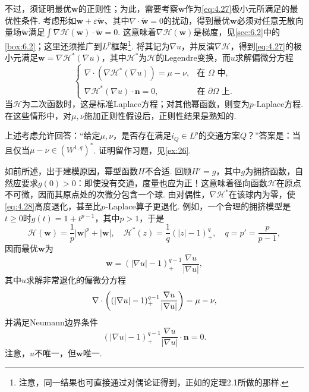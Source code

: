 \label{idx:root4-p160-helmholtz}不过，须证明最优$\mathbf w$的正则性；为此，需要考察$\mathbf w$作为\eqref{eq:4.27}极小元所满足的最优性条件. 考虑形如$\mathbf w+\varepsilon\widetilde{\mathbf w}$、其中$\nabla\cdot\widetilde{\mathbf w}=0$的扰动，得到最优$\mathbf w$必须对任意无散向量场$\widetilde{\mathbf w}$满足$\int\nabla\mathscr H(\mathbf w)\cdot\widetilde{\mathbf w}=0$. 这意味着$\nabla\mathscr H(\mathbf w)$是梯度，见\autoref{sec:6.2}中的\autoref{box:6.2}；这里还须推广到$L^p$框架\footnote{注意，同一结果也可直接通过对偶论证得到，正如\cite{b80}的定理2.1所做的那样.}. 将其记为$\nabla u$，并反演$\nabla\mathscr H$，得到\eqref{eq:4.27}的极小元满足$\mathbf w=\nabla\mathscr H^*(\nabla u)$，其中$\mathscr H^*$为$\mathscr H$的Legendre变换，而$u$求解偏微分方程
\begin{equation}\label{eq:4.28}
\begin{cases}
\nabla\cdot(\nabla\mathscr H^*(\nabla u))=\mu-\nu,&\text{在 }\Omega\text{ 中},\\
\nabla\mathscr H^*(\nabla u)\cdot\mathbf n=0,&\text{在 }\partial\Omega\text{ 上}.
\end{cases}
\end{equation}
当$\mathscr H$为二次函数时，这是标准Laplace方程；对其他幂函数，则变为$p$-Laplace方程. 在这些情形中，对$\mu,\nu$施加正则性假设后，正则性结果是熟知的.

\begin{remark}\label{obj:4.36}
上述考虑允许回答：“给定$\mu,\nu$，是否存在满足$i_Q\in L^p$的交通方案$Q$？”答案是：当且仅当$\mu-\nu\in(W^{1,q})^*$. 证明留作习题，见\autoref{ex:26}.
\end{remark}

如前所述，出于建模原因，幂型函数$H$不合适. 回顾$H'=g$，其中$g$为拥挤函数，自然应要求$g(0)>0$：即使没有交通，度量也应为正！这意味着径向函数$\mathscr H$在原点不可微，因而其原点处的次微分包含一个球. 由对偶性，$\nabla\mathscr H^*$在该球内为零，使\eqref{eq:4.28}高度退化，甚至比$p$-Laplace算子更退化. 例如，一个合理的拥挤模型是$t\geq0$时$g(t)=1+t^{p-1}$，其中$p>1$，于是
\begin{equation}\label{eq:4.29}
\mathscr H(\mathbf w)=\frac1p|\mathbf w|^p+|\mathbf w|,
\quad\mathscr H^*(z)=\frac1q(|z|-1)_+^q,
\quad q=p'=\frac{p}{p-1},
\end{equation}
因而最优$\mathbf w$为
\[
\mathbf w=(|\nabla u|-1)_+^{q-1}\frac{\nabla u}{|\nabla u|},
\]
其中$u$求解非常退化的偏微分方程
\begin{equation}\label{eq:4.30}\index{V157@高度退化的椭圆偏微分方程（very degenerate elliptic PDEs）|hyperpage}
\nabla\cdot\left((|\nabla u|-1)_+^{q-1}\frac{\nabla u}{|\nabla u|}\right)=\mu-\nu,
\end{equation}
并满足Neumann边界条件
\[
(|\nabla u|-1)_+^{q-1}\frac{\nabla u}{|\nabla u|}\cdot\mathbf n=0.
\]
注意，$u$不唯一，但$\mathbf w$唯一.

